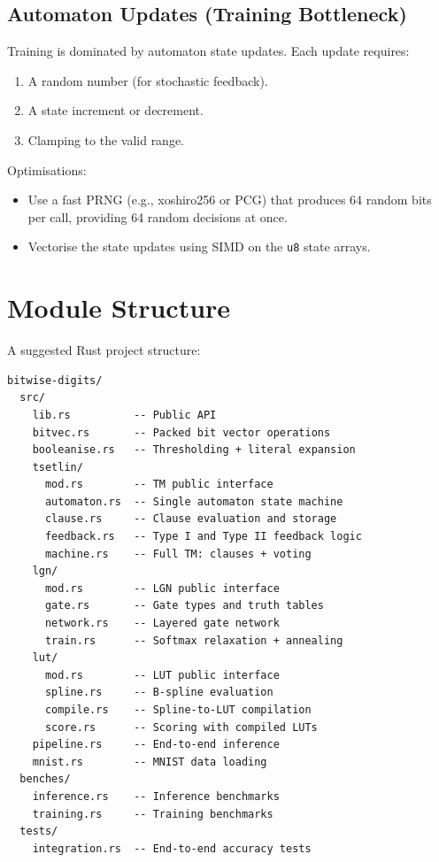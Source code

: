\subsection{Automaton Updates (Training Bottleneck)}

Training is dominated by automaton state updates. Each update
requires:
\begin{enumerate}
  \item A random number (for stochastic feedback).
  \item A state increment or decrement.
  \item Clamping to the valid range.
\end{enumerate}

Optimisations:
\begin{itemize}
  \item Use a fast PRNG (e.g., xoshiro256 or PCG) that produces
    64 random bits per call, providing 64 random decisions at once.
  \item Vectorise the state updates using SIMD on the \texttt{u8}
    state arrays.
\end{itemize}


\section{Module Structure}
\label{sec:modules}

A suggested Rust project structure:

\begin{verbatim}
bitwise-digits/
  src/
    lib.rs          -- Public API
    bitvec.rs       -- Packed bit vector operations
    booleanise.rs   -- Thresholding + literal expansion
    tsetlin/
      mod.rs        -- TM public interface
      automaton.rs  -- Single automaton state machine
      clause.rs     -- Clause evaluation and storage
      feedback.rs   -- Type I and Type II feedback logic
      machine.rs    -- Full TM: clauses + voting
    lgn/
      mod.rs        -- LGN public interface
      gate.rs       -- Gate types and truth tables
      network.rs    -- Layered gate network
      train.rs      -- Softmax relaxation + annealing
    lut/
      mod.rs        -- LUT public interface
      spline.rs     -- B-spline evaluation
      compile.rs    -- Spline-to-LUT compilation
      score.rs      -- Scoring with compiled LUTs
    pipeline.rs     -- End-to-end inference
    mnist.rs        -- MNIST data loading
  benches/
    inference.rs    -- Inference benchmarks
    training.rs     -- Training benchmarks
  tests/
    integration.rs  -- End-to-end accuracy tests
\end{verbatim}


